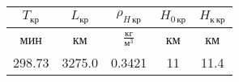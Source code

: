 \begin{tabular}{|c|c|c|c|c|}
\hline
$T_{кр}$ & $L_{кр}$ & $\rho_{H\, кр}$ & $H_{0\, кр}$ & $H_{к\, кр}$ \\ 
\hline
мин & км & $\frac{кг}{м^3}$ & км & км \\ 
\hline
298.73 & 3275.0 & 0.3421 & 11 & 11.4 \\ 
\hline
\end{tabular}